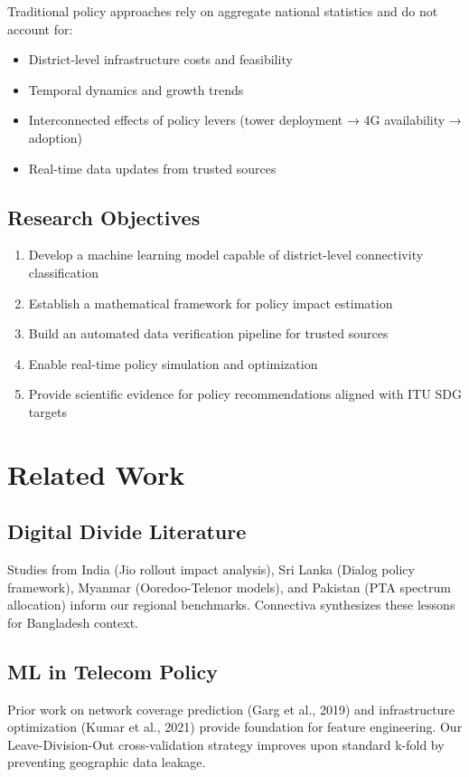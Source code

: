 \documentclass[11pt,a4paper]{article}
\begin{document}
Traditional policy approaches rely on aggregate national statistics and do not account for:
\begin{itemize}
  \item District-level infrastructure costs and feasibility
  \item Temporal dynamics and growth trends
  \item Interconnected effects of policy levers (tower deployment → 4G availability → adoption)
  \item Real-time data updates from trusted sources
\end{itemize}

\subsection{Research Objectives}
\begin{enumerate}
  \item Develop a machine learning model capable of district-level connectivity classification
  \item Establish a mathematical framework for policy impact estimation
  \item Build an automated data verification pipeline for trusted sources
  \item Enable real-time policy simulation and optimization
  \item Provide scientific evidence for policy recommendations aligned with ITU SDG targets
\end{enumerate}

\section{Related Work}

\subsection{Digital Divide Literature}
Studies from India (Jio rollout impact analysis), Sri Lanka (Dialog policy framework), Myanmar (Ooredoo-Telenor models), and Pakistan (PTA spectrum allocation) inform our regional benchmarks. Connectiva synthesizes these lessons for Bangladesh context.

\subsection{ML in Telecom Policy}
Prior work on network coverage prediction (Garg et al., 2019) and infrastructure optimization (Kumar et al., 2021) provide foundation for feature engineering. Our Leave-Division-Out cross-validation strategy improves upon standard k-fold by preventing geographic data leakage.
\end{document}
